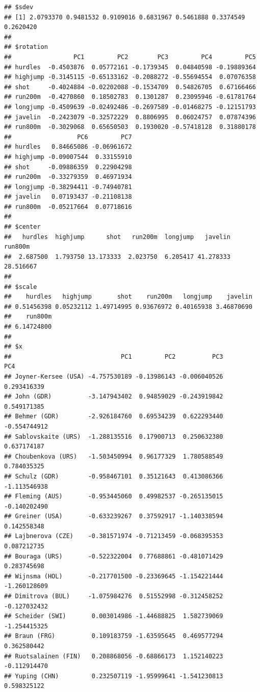 \documentclass[]{book}
\begin{document}
\begin{verbatim}
## $sdev
## [1] 2.0793370 0.9481532 0.9109016 0.6831967 0.5461888 0.3374549 0.2620420
## 
## $rotation
##                 PC1         PC2        PC3         PC4         PC5
## hurdles  -0.4503876  0.05772161 -0.1739345  0.04840598 -0.19889364
## highjump -0.3145115 -0.65133162 -0.2088272 -0.55694554  0.07076358
## shot     -0.4024884 -0.02202088 -0.1534709  0.54826705  0.67166466
## run200m  -0.4270860  0.18502783  0.1301287  0.23095946 -0.61781764
## longjump -0.4509639 -0.02492486 -0.2697589 -0.01468275 -0.12151793
## javelin  -0.2423079 -0.32572229  0.8806995  0.06024757  0.07874396
## run800m  -0.3029068  0.65650503  0.1930020 -0.57418128  0.31880178
##                  PC6         PC7
## hurdles   0.84665086 -0.06961672
## highjump -0.09007544  0.33155910
## shot     -0.09886359  0.22904298
## run200m  -0.33279359  0.46971934
## longjump -0.38294411 -0.74940781
## javelin   0.07193437 -0.21108138
## run800m  -0.05217664  0.07718616
## 
## $center
##   hurdles  highjump      shot   run200m  longjump   javelin   run800m 
##  2.687500  1.793750 13.173333  2.023750  6.205417 41.278333 28.516667 
## 
## $scale
##    hurdles   highjump       shot    run200m   longjump    javelin 
## 0.51456398 0.05232112 1.49714995 0.93676972 0.40165938 3.46870690 
##    run800m 
## 6.14724800 
## 
## $x
##                              PC1         PC2          PC3          PC4
## Joyner-Kersee (USA) -4.757530189 -0.13986143 -0.006040526  0.293416339
## John (GDR)          -3.147943402  0.94859029 -0.243919842  0.549171385
## Behmer (GDR)        -2.926184760  0.69534239  0.622293440 -0.554744912
## Sablovskaite (URS)  -1.288135516  0.17900713  0.250632380  0.637174187
## Choubenkova (URS)   -1.503450994  0.96177329  1.780588549  0.784035325
## Schulz (GDR)        -0.958467101  0.35121643  0.413086366 -1.113546938
## Fleming (AUS)       -0.953445060  0.49982537 -0.265135015 -0.140202490
## Greiner (USA)       -0.633239267  0.37592917 -1.140338594  0.142558348
## Lajbnerova (CZE)    -0.381571974 -0.71213459 -0.068395353  0.087212735
## Bouraga (URS)       -0.522322004  0.77688861 -0.481071429  0.283745698
## Wijnsma (HOL)       -0.217701500 -0.23369645 -1.154221444 -1.260128609
## Dimitrova (BUL)     -1.075984276  0.51552998 -0.312458252 -0.127032432
## Scheider (SWI)       0.003014986 -1.44688825  1.582739069 -1.254415325
## Braun (FRG)          0.109183759 -1.63595645  0.469577294  0.362580442
## Ruotsalainen (FIN)   0.208868056 -0.68866173  1.152140223 -0.112914470
## Yuping (CHN)         0.232507119 -1.95999641 -1.541230813  0.598325122

\end{verbatim}
\end{document}

